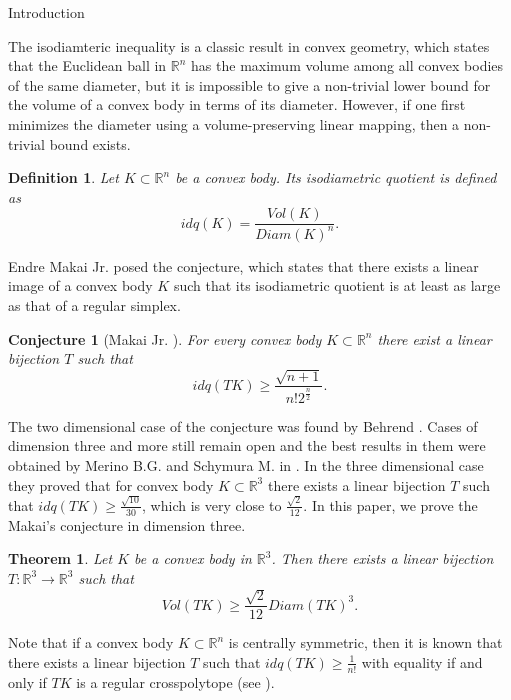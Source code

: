 \documentclass[12pt]{article}
\newcommand\R{\mathbb R}
\newtheorem{theorem}{Theorem}[section]
\newtheorem{conj}{Conjecture}[section]
\newtheorem{definition}{Definition}[section]
\begin{document}
\begin{section}{Introduction}

    The isodiamteric inequality is a classic result in convex geometry, which states  that the Euclidean ball in $\mathbb{R}^n$ has the maximum volume among all convex bodies of the same diameter, but it is impossible to give a non-trivial lower bound for the volume of a convex body in terms of its diameter. However, if one first minimizes the diameter using a volume-preserving linear mapping, then a non-trivial bound exists. 

    \begin{definition}
        Let $K \subset \mathbb{R}^{n}$ be a convex body. Its isodiametric quotient is defined as 
        $$
            idq(K) = \frac{Vol(K)}{Diam(K)^n}.
        $$
    \end{definition}    

    Endre Makai Jr. \cite{makai1978} posed the conjecture, which states that there exists a linear image of a convex body $K$ such that its isodiametric quotient is at least as large as  that of a regular simplex.
    
    \begin{conj}[Makai Jr. \cite{makai1978}]
        For every convex body $K\subset \mathbb{R}^n$ there exist a linear bijection $T$ such that 
        $$
            idq(TK)\geq \frac{\sqrt{n+1}}{n! 2^{\frac{n}{2}}}.
        $$
    \end{conj}
    
    The two dimensional case of the conjecture was found by Behrend \cite{behrend}. Cases of dimension three and more still remain open and the best results in them were obtained by Merino B.G. and  Schymura M. in \cite{shimura}. In the three dimensional case they proved that for convex body $K\subset \mathbb{R}^3$ there exists a linear bijection $T$ such that $idq(TK)\geq \frac{\sqrt{10}}{30}$, which is very close to $\frac{\sqrt{2}}{12}$. In this paper, we prove the Makai's conjecture in dimension three.

    

    \begin{theorem}
    \label{main-th}
        Let $K$ be a convex body in $\R^{3}$. Then there exists a linear bijection $T:\mathbb{R}^{3}\to \mathbb{R}^{3}$ such that $$
            Vol(TK)\geq \frac{\sqrt{2}}{12}Diam(TK)^3.
        $$      
    \end{theorem}

    Note that if a convex body $K \subset \mathbb{R}^{n}$ is centrally symmetric, then it is known that there exists a linear bijection $T$ such that $idq(TK)\geq \frac{1}{n!}$  with equality if and only if $TK$ is a regular crosspolytope (see \cite{barthe}). 


\end{section}
\end{document}
